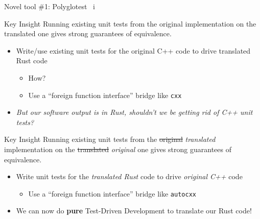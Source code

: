 \documentclass[10pt,aspectratio=169]{beamer}
\begin{document}
\begin{frame}{Novel tool \#1: Polyglotest \ i}
    \begin{overprint}
            \begin{alertblock}{Key Insight}
                \vspace*{0.25cm}
                Running existing unit tests from the original implementation on the translated one gives strong guarantees of equivalence.
            \end{alertblock}
            \vspace*{1cm}
            \begin{itemize}
                \item<2-> Write/use existing unit tests for the original C++ code to drive translated Rust code
                \begin{itemize}
                    \item<3-> How?
                    \item<4-> Use a ``foreign function interface'' bridge like \texttt{cxx}
                \end{itemize}
                \item<5-> \textit{But our software output is in Rust, shouldn't we be getting rid of C++ unit tests?}
            \end{itemize}
            \begin{alertblock}{Key Insight}
                \vspace*{0.25cm}
                Running existing unit tests from the \sout{original} \textit{translated} implementation on the \sout{translated} \textit{original} one gives strong guarantees of equivalence.
            \end{alertblock}
            \vspace*{1cm}
            \begin{itemize}
                \item<7-> Write unit tests for the \textit{translated Rust} code to drive \textit{original C++} code
                \begin{itemize}
                    \item Use a ``foreign function interface'' bridge like \texttt{autocxx}
                \end{itemize}
                \vspace*{0.5cm}
                \item<8-> \alert{We can now do \textbf{pure} Test-Driven Development to translate our Rust code!}
            \end{itemize}
    \end{overprint}

\end{frame}
\end{document}
